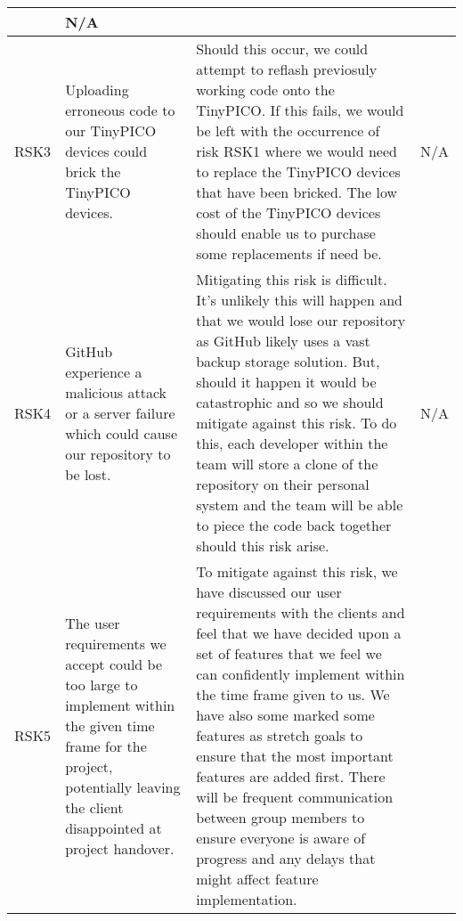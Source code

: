 \begin{xltabular}[H]{1.5\textwidth}{c | X | X | X}
    &
    
    N/A\\

    \midrule

    RSK3

    &

    Uploading erroneous code to our TinyPICO devices could brick the TinyPICO devices.

    &

    Should this occur, we could attempt to reflash previosuly working code onto the TinyPICO. If this fails, we would be left with the occurrence of risk RSK1 where we would need to replace the TinyPICO devices that have been bricked. The low cost of the TinyPICO devices should enable us to purchase some replacements if need be.
    
    &
    
    N/A\\

    \midrule

    RSK4

    &

    GitHub experience a malicious attack or a server failure which could cause our repository to be lost.

    &

    Mitigating this risk is difficult. It's unlikely this will happen and that we would lose our repository as GitHub likely uses a vast backup storage solution. But, should it happen it would be catastrophic and so we should mitigate against this risk. To do this, each developer within the team will store a clone of the repository on their personal system and the team will be able to piece the code back together should this risk arise.
    
    &
    
    N/A\\

    \midrule

    RSK5

    &

    The user requirements we accept could be too large to implement within the given time frame for the project, potentially leaving the client disappointed at project handover.

    &

    To mitigate against this risk, we have discussed our user requirements with the clients and feel that we have decided upon a set of features that we feel we can confidently implement within the time frame given to us. We have also some marked some features as stretch goals to ensure that the most important features are added first. There will be frequent communication between group members to ensure everyone is aware of progress and any delays that might affect feature implementation.
    

\end{xltabular}
